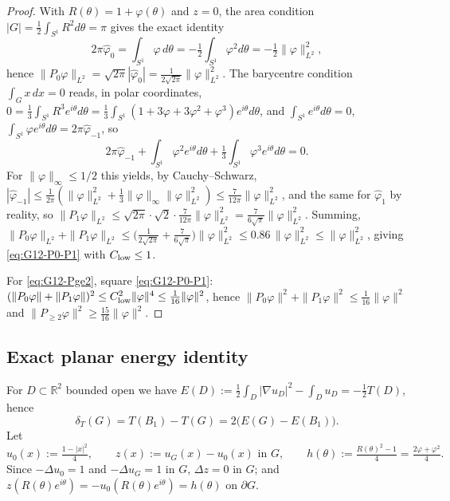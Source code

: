 \documentclass[11pt]{amsart}
\newcommand{\R}{\mathbb R}
\newcommand{\dT}{\delta_T}
\begin{document}
\begin{proof}
With \(R(\theta)=1+\varphi(\theta)\) and \(z=0\), the area condition
\(|G|=\tfrac12\int_{S^1}R^2 d\theta=\pi\) gives the exact identity
\begin{equation}\label{eq:area-exact-12}
   2\pi\hat\varphi_0
     =\int_{S^1}\varphi\,d\theta
     =-\tfrac12\int_{S^1}\varphi^2 d\theta
     =-\tfrac12\|\varphi\|_{L^2}^2 ,
\end{equation}
hence
\(\|P_0\varphi\|_{L^2}=\sqrt{2\pi}|\hat\varphi_0|
=\tfrac{1}{2\sqrt{2\pi}}\|\varphi\|_{L^2}^2\).
The barycentre condition \(\int_G x\,dx=0\) reads, in polar
coordinates,
\(0=\tfrac13\int_{S^1}R^3 e^{i\theta}d\theta
=\tfrac13\int_{S^1}(1+3\varphi+3\varphi^2+\varphi^3)e^{i\theta}d\theta\),
and \(\int_{S^1}e^{i\theta}d\theta=0\),
\(\int_{S^1}\varphi e^{i\theta}d\theta=2\pi\hat\varphi_{-1}\), so
\begin{equation}\label{eq:bary-exact-12}
   2\pi\hat\varphi_{-1}
   +\int_{S^1}\varphi^2 e^{i\theta}d\theta
   +\tfrac13\int_{S^1}\varphi^3 e^{i\theta}d\theta=0.
\end{equation}
For \(\|\varphi\|_\infty\le 1/2\) this yields, by Cauchy--Schwarz,
\(|\hat\varphi_{-1}|\le
\tfrac{1}{2\pi}(\|\varphi\|_{L^2}^2+\tfrac13\|\varphi\|_\infty
\|\varphi\|_{L^2}^2)\le\tfrac{7}{12\pi}\|\varphi\|_{L^2}^2\),
and the same for \(\hat\varphi_1\) by reality, so
\(\|P_1\varphi\|_{L^2}\le
\sqrt{2\pi}\cdot\sqrt{2}\cdot\tfrac{7}{12\pi}\|\varphi\|_{L^2}^2
=\tfrac{7}{6\sqrt\pi}\|\varphi\|_{L^2}^2\).
Summing,
\(\|P_0\varphi\|_{L^2}+\|P_1\varphi\|_{L^2}
\le \bigl(\tfrac{1}{2\sqrt{2\pi}}+\tfrac{7}{6\sqrt\pi}\bigr)
\|\varphi\|_{L^2}^2\le 0.86\,\|\varphi\|_{L^2}^2\le\|\varphi\|_{L^2}^2\),
giving \eqref{eq:G12-P0-P1} with \(C_{\rm low}\le 1\).

For \eqref{eq:G12-Pge2}, square \eqref{eq:G12-P0-P1}:
\((\|P_0\varphi\|+\|P_1\varphi\|)^2\le C_{\rm low}^2\|\varphi\|^4
\le\tfrac{1}{16}\|\varphi\|^2\), hence
\(\|P_0\varphi\|^2+\|P_1\varphi\|^2\le\tfrac{1}{16}\|\varphi\|^2\)
and \(\|P_{\ge 2}\varphi\|^2\ge\tfrac{15}{16}\|\varphi\|^2\).
\end{proof}

\subsection{Exact planar energy identity}
\label{ss:G12-energy}

For \(D\subset\R^2\) bounded open we have
\(E(D):=\tfrac12\int_D|\nabla u_D|^2-\int_D u_D=-\tfrac12 T(D)\),
hence
\begin{equation}\label{eq:dT-from-E-12}
   \dT(G)=T(B_1)-T(G)=2\bigl(E(G)-E(B_1)\bigr).
\end{equation}
Let
\begin{equation}\label{eq:u0-z-h-12}
   u_0(x):=\tfrac{1-|x|^2}{4},\qquad
   z(x):=u_G(x)-u_0(x)\text{ in }G,\qquad
   h(\theta):=\tfrac{R(\theta)^2-1}{4}=\tfrac{2\varphi+\varphi^2}{4}.
\end{equation}
Since \(-\Delta u_0=1\) and \(-\Delta u_G=1\) in \(G\), \(\Delta z=0\)
in \(G\); and \(z(R(\theta)e^{i\theta})
=-u_0(R(\theta)e^{i\theta})=h(\theta)\) on \(\partial G\).
\end{document}
